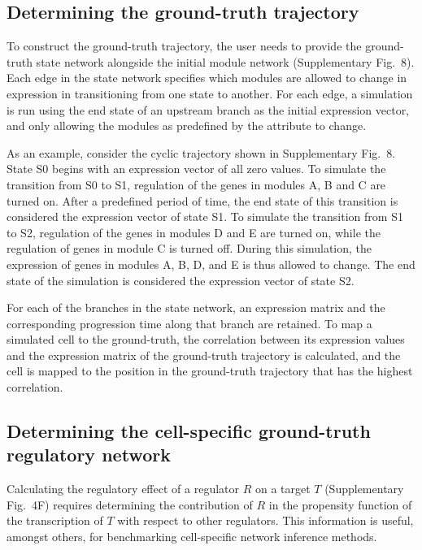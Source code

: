 \documentclass[10pt, a4paper]{article}
\begin{document}
\hypertarget{sec:dyngen-groundtruth}{%
	\subsection*{Determining the ground-truth
		trajectory}\label{sec:dyngen-groundtruth}}

To construct the ground-truth trajectory, the user needs to provide the
ground-truth state network alongside the initial module network
(Supplementary Fig.~8). Each edge in the state network specifies which
modules are allowed to change in expression in transitioning from one
state to another. For each edge, a simulation is run using the end state
of an upstream branch as the initial expression vector, and only
allowing the modules as predefined by the attribute to change.

As an example, consider the cyclic trajectory shown in Supplementary
Fig.~8. State S0 begins with an expression vector of all zero values. To
simulate the transition from S0 to S1, regulation of the genes in
modules A, B and C are turned on. After a predefined period of time, the
end state of this transition is considered the expression vector of
state S1. To simulate the transition from S1 to S2, regulation of the
genes in modules D and E are turned on, while the regulation of genes in
module C is turned off. During this simulation, the expression of genes
in modules A, B, D, and E is thus allowed to change. The end state of
the simulation is considered the expression vector of state S2.

For each of the branches in the state network, an expression matrix and
the corresponding progression time along that branch are retained. To
map a simulated cell to the ground-truth, the correlation between its
expression values and the expression matrix of the ground-truth
trajectory is calculated, and the cell is mapped to the position in the
ground-truth trajectory that has the highest correlation.

\hypertarget{sec:dyngen-extractgrn}{%
	\subsection*{Determining the cell-specific ground-truth regulatory
		network}\label{sec:dyngen-extractgrn}}

Calculating the regulatory effect of a regulator \(R\) on a target \(T\)
(Supplementary Fig.~4F) requires determining the contribution of \(R\)
in the propensity function of the transcription of \(T\) with respect to
other regulators. This information is useful, amongst others, for
benchmarking cell-specific network inference methods.
\end{document}
